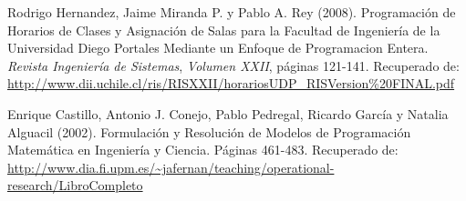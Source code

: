 \documentclass[a4paper]{article}
\begin{document}
\begin{thebibliography}{X}















 Rodrigo Hernandez, Jaime Miranda P. y Pablo A. Rey (2008). Programación de Horarios de Clases y Asignación de Salas para la Facultad de Ingeniería de la Universidad Diego Portales Mediante un Enfoque de Programacion Entera. \textit{Revista Ingeniería de Sistemas}, \textit{Volumen XXII}, páginas 121-141.
Recuperado de: \url{http://www.dii.uchile.cl/ris/RISXXII/horariosUDP_RISVersion%20FINAL.pdf}


Enrique Castillo, Antonio J. Conejo, Pablo Pedregal, Ricardo García y Natalia Alguacil (2002). Formulación y Resolución de Modelos de Programación Matemática en Ingeniería y Ciencia. Páginas 461-483.
Recuperado de: \url{http://www.dia.fi.upm.es/~jafernan/teaching/operational-research/LibroCompleto}



\end{thebibliography}
\end{document}
